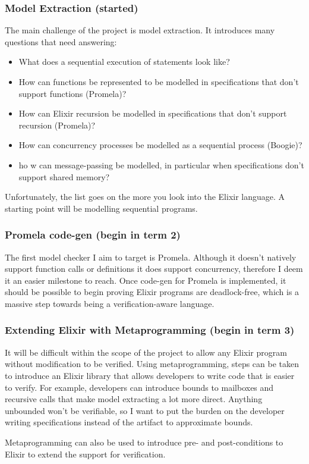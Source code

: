 \subsubsection[]{Model Extraction (started)}
The main challenge of the project is model extraction. It introduces many questions that need answering:
\begin{itemize}
    \item What does a sequential execution of statements look like?
    \item How can functions be represented to be modelled in specifications that don't support functions (Promela)?
    \item How can Elixir recursion be modelled in specifications that don't support recursion (Promela)?
    \item How can concurrency processes be modelled as a sequential process (Boogie)?
    \item ho
    w can message-passing be modelled, in particular when specifications don't support shared memory?
\end{itemize}
Unfortunately, the list goes on the more you look into the Elixir language. A starting point will be modelling sequential programs.
\subsubsection[]{Promela code-gen (begin in term 2)}
The first model checker I aim to target is Promela. Although it doesn't natively support function calls or definitions it does support concurrency, therefore I deem it an easier milestone to reach. Once code-gen for Promela is implemented, it should be possible to begin proving Elixir programs are deadlock-free, which is a massive step towards being a verification-aware language.
\subsubsection[]{Extending Elixir with Metaprogramming (begin in term 3)}
It will be difficult within the scope of the project to allow any Elixir program without modification to be verified. Using metaprogramming, steps can be taken to introduce an Elixir library that allows developers to write code that is easier to verify. For example, developers can introduce bounds to mailboxes and recursive calls that make model extracting a lot more direct. Anything unbounded won't be verifiable, so I want to put the burden on the developer writing specifications instead of the artifact to approximate bounds.
\par
Metaprogramming can also be used to introduce pre- and post-conditions to Elixir to extend the support for verification.
